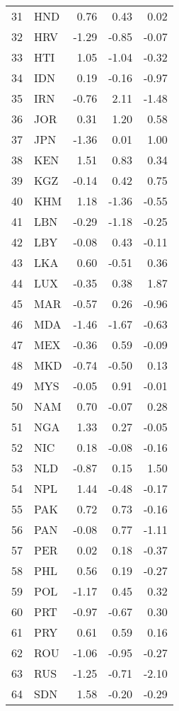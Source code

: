 \begin{table}[ht]
\begin{tabular}{rlrrr}
  31 & HND & 0.76 & 0.43 & 0.02 \\ 
  32 & HRV & -1.29 & -0.85 & -0.07 \\ 
  33 & HTI & 1.05 & -1.04 & -0.32 \\ 
  34 & IDN & 0.19 & -0.16 & -0.97 \\ 
  35 & IRN & -0.76 & 2.11 & -1.48 \\ 
  36 & JOR & 0.31 & 1.20 & 0.58 \\ 
  37 & JPN & -1.36 & 0.01 & 1.00 \\ 
  38 & KEN & 1.51 & 0.83 & 0.34 \\ 
  39 & KGZ & -0.14 & 0.42 & 0.75 \\ 
  40 & KHM & 1.18 & -1.36 & -0.55 \\ 
  41 & LBN & -0.29 & -1.18 & -0.25 \\ 
  42 & LBY & -0.08 & 0.43 & -0.11 \\ 
  43 & LKA & 0.60 & -0.51 & 0.36 \\ 
  44 & LUX & -0.35 & 0.38 & 1.87 \\ 
  45 & MAR & -0.57 & 0.26 & -0.96 \\ 
  46 & MDA & -1.46 & -1.67 & -0.63 \\ 
  47 & MEX & -0.36 & 0.59 & -0.09 \\ 
  48 & MKD & -0.74 & -0.50 & 0.13 \\ 
  49 & MYS & -0.05 & 0.91 & -0.01 \\ 
  50 & NAM & 0.70 & -0.07 & 0.28 \\ 
  51 & NGA & 1.33 & 0.27 & -0.05 \\ 
  52 & NIC & 0.18 & -0.08 & -0.16 \\ 
  53 & NLD & -0.87 & 0.15 & 1.50 \\ 
  54 & NPL & 1.44 & -0.48 & -0.17 \\ 
  55 & PAK & 0.72 & 0.73 & -0.16 \\ 
  56 & PAN & -0.08 & 0.77 & -1.11 \\ 
  57 & PER & 0.02 & 0.18 & -0.37 \\ 
  58 & PHL & 0.56 & 0.19 & -0.27 \\ 
  59 & POL & -1.17 & 0.45 & 0.32 \\ 
  60 & PRT & -0.97 & -0.67 & 0.30 \\ 
  61 & PRY & 0.61 & 0.59 & 0.16 \\ 
  62 & ROU & -1.06 & -0.95 & -0.27 \\ 
  63 & RUS & -1.25 & -0.71 & -2.10 \\ 
  64 & SDN & 1.58 & -0.20 & -0.29 \\ 

\end{tabular}
\end{table}
